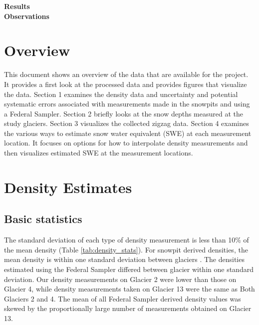 \documentclass[12pt]{article}
\begin{document}

\begin{center}
\Large \textbf{Results\\ Observations}
\end{center}


\section*{Overview}

This document shows an overview of the data that are available for the project. It provides a first look at the processed data and provides figures that visualize the data. Section 1 examines the density data and uncertainty and potential systematic errors associated with measurements made in the snowpits and using a Federal Sampler. Section 2 briefly looks at the snow depths measured at the study glaciers. Section 3 visualizes the collected zigzag data. Section 4 examines the various ways to estimate snow water equivalent (SWE) at each measurement location. It focuses on options for how to interpolate density measurements and then visualizes estimated SWE at the measurement locations. 


\tableofcontents
\pagebreak



\section{Density Estimates}

\subsection{Basic statistics}

The standard deviation of each type of density measurement is less than 10\% of the mean density (Table \ref{tab:density_stats}). For snowpit derived densities, the mean density is within one standard deviation between glaciers . The densities estimated using the Federal Sampler differed between glacier within one standard deviation. Our density measurements on Glacier 2 were lower than those on Glacier 4, while density measurements taken on Glacier 13 were the same as Both Glaciers 2 and 4. The mean of all Federal Sampler derived density values was skewed by the proportionally large number of measurements obtained on Glacier 13.
\end{document}

